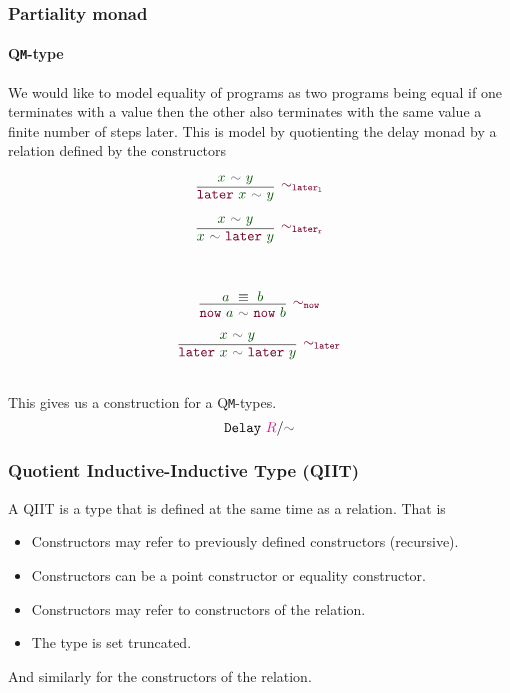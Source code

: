 \documentclass[xelatex,mathserif,serif,notheorems]{beamer} %
\theoremstyle{plain} %
\theoremstyle{definition}
\theoremstyle{remark}
\newcommand*{\term}[1]{\textcolor{green!30!black}{#1}} %
\newcommand*{\type}[1]{\textcolor{magenta!90!black}{#1}}
\newcommand*{\relation}[1]{\textcolor{gray!75!black}{\ensuremath{\mathtt{#1}}}}
\newcommand*{\constructor}[1]{\textcolor{purple!60!black}{\ensuremath{\mathtt{#1}}}}
\newcommand*{\typeformer}[1]{\ensuremath{\mathtt{#1}}}
\begin{document}
\begin{frame}
  \frametitle{Partiality monad}
  \framesubtitle{Q\texttt{M}-type}
  We would like to model equality of programs as two programs being equal if one terminates with a value then the other also terminates with the same value a finite number of steps later. This is model by quotienting the delay monad by a relation defined by the constructors
  \strut
  \hfill
  \begin{minipage}{0.4\linewidth}
    \begin{equation}
      \vcenter{\infer[{\constructor{\sim_{later_l}}}]{\constructor{later}~\term{x}~\relation{\sim}~\term{y}}{\term{x}~\relation{\sim}~\term{y}}}
    \end{equation}
  \end{minipage}
  \hfill
    \begin{minipage}{0.4\linewidth}
    \begin{equation}
      \vcenter{\infer[{\constructor{\sim_{later_r}}}]{\term{x}~\relation{\sim}~\constructor{later}~\term{y}}{\term{x}~\relation{\sim}~\term{y}}}
    \end{equation}
  \end{minipage}
  \hfill
  \strut
  \\
  \strut
  \hfill
  \begin{minipage}{0.4\linewidth}
    \begin{equation}
      \vcenter{\infer[{\constructor{\sim_{now}}}]{\constructor{now}~\term{a}~\relation{\sim}~\constructor{now}~\term{b}}{\term{a}~\equiv~\term{b}}}
    \end{equation}
  \end{minipage}
  \hfill
  \begin{minipage}{0.5\linewidth}
    \begin{equation}
      \vcenter{\infer[{\constructor{\sim_{later}}}]{\constructor{later}~\term{x}~\relation{\sim}~\constructor{later}~\term{y}}{\term{x}~\relation{\sim}~\term{y}}}
    \end{equation}
  \end{minipage}
  \hfill
  \strut
  \\[5mm]
  This gives us a construction for a Q\texttt{M}-types.
  \begin{equation}
    \typeformer{Delay}~\type{R}/\relation{\sim}
  \end{equation}
\end{frame}

\begin{frame}
  \frametitle{Quotient Inductive-Inductive Type (QIIT)}
  A QIIT is a type that is defined at the same time as a relation. That is
  \begin{itemize}
  \item Constructors may refer to previously defined constructors (recursive).
  \item Constructors can be a point constructor or equality constructor.
  \item Constructors may refer to constructors of the relation.
  \item The type is set truncated.
  \end{itemize}
  And similarly for the constructors of the relation.
\end{frame}
\end{document}
